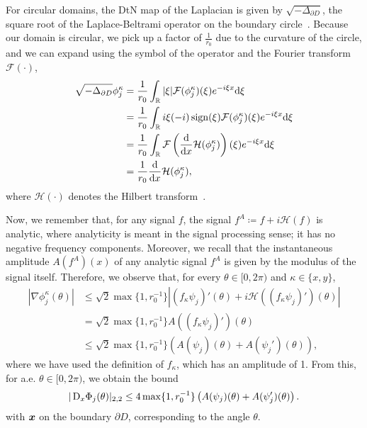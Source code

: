 \begin{itemize}
    For circular domains, the DtN map of the Laplacian is given by $\sqrt{-\Delta_{\partial D}}$, the square root of the Laplace-Beltrami operator on the boundary circle~\cite{girouard2022}.
    Because our domain is circular, we pick up a factor of $\frac{1}{r_0}$ due to the curvature of the circle, and we can expand using the symbol of the operator and the Fourier transform $\mathcal{F}(\cdot)$,
    \begin{align*}
        \sqrt{-\Delta_{\partial D}} \phi_j^\kappa
        &=\frac{1}{r_0}\int_\mathbb{R} |\xi| \mathcal{F}(\phi_j^\kappa )(\xi) e^{-i \xi x} \mathrm{d}\xi\\
        &=\frac{1}{r_0}\int_\mathbb{R} i\xi (-i) \operatorname{sign}(\xi) \mathcal{F}(\phi_j^\kappa )(\xi) e^{-i \xi x} \mathrm{d}\xi\\
        &=\frac{1}{r_0}\int_\mathbb{R} \mathcal{F}\left(\frac{\mathrm{d}}{\mathrm{d} x}\mathcal{H}(\phi_j^\kappa )\right) (\xi) e^{-i \xi x} \mathrm{d}\xi\\
        &=\frac{1}{r_0}\frac{\mathrm{d}}{\mathrm{d} x}\mathcal{H}(\phi_j^\kappa ),
    \end{align*}
    where $\mathcal{H}(\cdot)$ denotes the Hilbert transform~\cite{hahn1996}.

    Now, we remember that, for any signal $f$, the signal $f^A\coloneqq f+i\mathcal{H}(f)$ is analytic, where analyticity is meant in the signal processing sense; it has no negative frequency components.
    Moreover, we recall that the instantaneous amplitude $A(f^A)(x)$ of any analytic signal $f^A$ is given by the modulus of the signal itself.
    Therefore, we observe that, for every $\theta\in[0,2\pi)$ and $\kappa \in \{x,y\}$,
    \begin{align}
        \left| \nabla \phi_j^\kappa(\theta)  \right|&\leq \sqrt{2} \max\{1, r_0^{-1}\} \left|(f_\kappa\psi_j)'(\theta) + i \mathcal{H}\left( (f_\kappa\psi_j)' \right)(\theta)  \right| \nonumber\\
        &= \sqrt{2} \max\{1, r_0^{-1}\} A((f_\kappa\psi_j)')(\theta) \nonumber\\
        &\leq \sqrt{2} \max\{1, r_0^{-1}\} \left( A(\psi_j)(\theta) + A(\psi_j')(\theta) \right),
    \end{align}
    where we have used the definition of $f_\kappa$, which has an amplitude of 1.
    From this, for a.e. $\theta \in [0,2\pi)$, we obtain the bound
    \begin{align*}
        |\mathop{}\!\mathrm{D}_x\Phi_j(\theta)|_{2,2} \leq  4 \max\{1, r_0^{-1}\}  \left( A(\psi_j)(\theta) + A(\psi_j')(\theta) \right).
    \end{align*}
    with ${{\bm{x}}}$ on the boundary $\partial D$, corresponding to the angle $\theta$.

\end{itemize}
